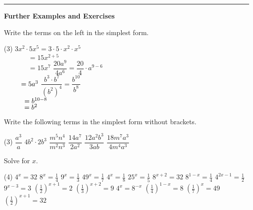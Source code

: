\pagebreak[4]%
\hrule
\begin{center} \textbf{Further Examples and Exercises} \end{center}
\begin{example}
	Write the terms on the left in the simplest form.
	\begin{tasks}(3)
		\task $3x^2\cdot 5x^5=3\cdot 5\cdot x^2\cdot x^5$ \\
		$\phantom{3x^2\cdot 5x^5}=15x^{2+5}$ \\
		$\phantom{3x^2\cdot 5x^5}=15x^7$
		\task $\dfrac{20a^9}{4a^6}=\dfrac{20}{4}\cdot a^{9-6}$ \\
		$\smash{\phantom{\dfrac{20a^9}{4a^6}}}=5a^3$
		\task $\dfrac{b^3\cdot b^7}{\left(b^2\right)^4}=\dfrac{b^{10}}{b^8}$ \\
		$\smash{\phantom{\dfrac{b^3\cdot b^7}{\left(b^2\right)^4}}}=b^{10-8}$ \\
		$\smash{\phantom{\dfrac{b^3\cdot b^7}{\left(b^2\right)^4}}}=b^2$ 
	\end{tasks}
\end{example}
\begin{exercise}
	Write the following terms in the simplest form without brackets.
	\begin{tasks}(3)
		\task $\dfrac{a^3}{a}$
		\task $4b^2\cdot 2b^3$
		\task $\dfrac{m^5n^4}{m^2n^3}$
		\task $\dfrac{14a^7}{2a^2}$
		\task $\dfrac{12a^2b^3}{3ab}$
		\task $\dfrac{18m^7a^3}{4m^4a^3}$
	\end{tasks}
\end{exercise}
\begin{exercise}
	Solve for $x$.
	\begin{tasks}(4)
		\task $4^x=32$ \task $8^x=\frac{1}{4}$ \task $9^x=\frac{1}{3}$ \task $49^x=\frac{1}{7}$
		\task $4^x=\frac{1}{8}$ \task $25^x=\frac{1}{5}$ \task $8^{x+2}=32$
		\task $8^{1-x}=\frac{1}{4}$
		\task $4^{2x-1}=\frac{1}{2}$ \task $9^{x-3}=3$ \task $\left(\frac{1}{2}\right)^{x+1}=2$
		\task $\left(\frac{1}{3}\right)^{x+2}=9$
		\task $4^x=8^{-x}$ \task $\left(\frac{1}{4}\right)^{1-x}=8$
		\task $\left(\frac{1}{7}\right)^x=49$ \task $\left(\frac{1}{2}\right)^{x+1}=32$ 
	\end{tasks}
\end{exercise}
